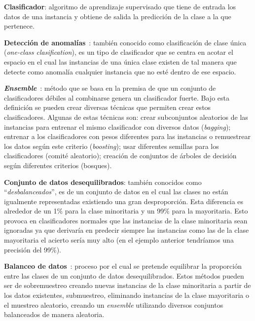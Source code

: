 \textbf{Clasificador}: algoritmo de aprendizaje supervisado que tiene de entrada los datos de una instancia y obtiene de salida la predicción de la clase a la que pertenece.

\textbf{Detección de anomalías}~\cite{wiki:ooc}: también conocido como clasificación de clase única (\textit{one-class clasification}), es un tipo de clasificador que se centra en acotar el espacio en el cual las instancias de una única clase existen de tal manera que detecte como anomalía cualquier instancia que no esté dentro de ese espacio.

\textbf{\textit{Ensemble}}~\cite{ubu:mineria3}: método que se basa en la premisa de que un conjunto de clasificadores débiles al combinarse genera un clasificador fuerte. Bajo esta definición se pueden crear diversas técnicas que permiten crear estos clasificadores. Algunas de estas técnicas son: crear subconjuntos aleatorios de las instancias para entrenar el mismo clasificador con diversos datos (\textit{bagging}); entrenar a los clasificadores con pesos diferentes para las instancias o remuestrear los datos según este criterio (\textit{boosting}); usar diferentes semillas para los clasificadores (comité aleatorio); creación de conjuntos de árboles de decisión según diferentes criterios (bosques).

\textbf{Conjunto de datos desequilibrados}: también conocidos como ``\textit{desbalanceados}'', es de un conjunto de datos en el cual las clases no están igualmente representadas existiendo una gran desproporción. Esta diferencia es alrededor de un 1\% para la clase minoritaria y un 99\% para la mayoritaria. Esto provoca en clasificadores normales que las instancias de la clase minoritaria sean ignoradas ya que derivaría en predecir siempre las instancias como las de la clase mayoritaria el acierto sería muy alto (en el ejemplo anterior tendríamos una precisión del 99\%).

\textbf{Balanceo de datos}~\cite{diez2015random, diez2015diversity, galar2012review}: proceso por el cual se pretende equilibrar la proporción entre las clases de un conjunto de datos desequilibrados. Estos métodos pueden ser de sobremuestreo creando nuevas instancias de la clase minoritaria a partir de los datos existentes, submuestreo, eliminando instancias de la clase mayoritaria o el muestreo aleatorio, creando un \textit{ensemble} utilizando diversos conjuntos balanceados de manera aleatoria.